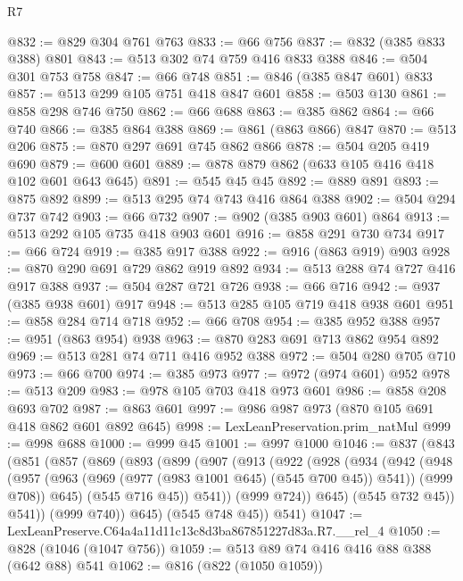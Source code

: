 \begin{lexlean}{R7}
\begin{coremodule}
@832 := @829 @304 @761 @763
@833 := @66 @756
@837 := @832 (@385 @833 @388) @801
@843 := @513 @302 @74 @759 @416 @833 @388
@846 := @504 @301 @753 @758
@847 := @66 @748
@851 := @846 (@385 @847 @601) @833
@857 := @513 @299 @105 @751 @418 @847 @601
@858 := @503 @130
@861 := @858 @298 @746 @750
@862 := @66 @688
@863 := @385 @862
@864 := @66 @740
@866 := @385 @864 @388
@869 := @861 (@863 @866) @847
@870 := @513 @206
@875 := @870 @297 @691 @745 @862 @866
@878 := @504 @205 @419 @690
@879 := @600 @601
@889 := @878 @879 @862 (@633 @105 @416 @418 @102 @601 @643 @645)
@891 := @545 @45 @45
@892 := @889 @891
@893 := @875 @892
@899 := @513 @295 @74 @743 @416 @864 @388
@902 := @504 @294 @737 @742
@903 := @66 @732
@907 := @902 (@385 @903 @601) @864
@913 := @513 @292 @105 @735 @418 @903 @601
@916 := @858 @291 @730 @734
@917 := @66 @724
@919 := @385 @917 @388
@922 := @916 (@863 @919) @903
@928 := @870 @290 @691 @729 @862 @919 @892
@934 := @513 @288 @74 @727 @416 @917 @388
@937 := @504 @287 @721 @726
@938 := @66 @716
@942 := @937 (@385 @938 @601) @917
@948 := @513 @285 @105 @719 @418 @938 @601
@951 := @858 @284 @714 @718
@952 := @66 @708
@954 := @385 @952 @388
@957 := @951 (@863 @954) @938
@963 := @870 @283 @691 @713 @862 @954 @892
@969 := @513 @281 @74 @711 @416 @952 @388
@972 := @504 @280 @705 @710
@973 := @66 @700
@974 := @385 @973
@977 := @972 (@974 @601) @952
@978 := @513 @209
@983 := @978 @105 @703 @418 @973 @601
@986 := @858 @208 @693 @702
@987 := @863 @601
@997 := @986 @987 @973 (@870 @105 @691 @418 @862 @601 @892 @645)
@998 := LexLeanPreservation.prim_natMul
@999 := @998 @688
@1000 := @999 @45
@1001 := @997 @1000
@1046 := @837
    (@843
      (@851
        (@857
          (@869
            (@893
              (@899
                (@907
                  (@913
                    (@922
                      (@928
                        (@934
                          (@942
                            (@948
                              (@957
                                (@963 (@969 (@977 (@983 @1001 @645) (@545 @700 @45)) @541))
                                (@999 @708))
                              @645)
                            (@545 @716 @45))
                          @541))
                      (@999 @724))
                    @645)
                  (@545 @732 @45))
                @541))
            (@999 @740))
          @645)
        (@545 @748 @45))
      @541)
@1047 := LexLeanPreserve.C64a4a11d11c13c8d3ba867851227d83a.R7.__rel_4
@1050 := @828 (@1046 (@1047 @756))
@1059 := @513 @89 @74 @416 @416 @88 @388 (@642 @88) @541
@1062 := @816 (@822 (@1050 @1059))

\end{coremodule}
\end{lexlean}
